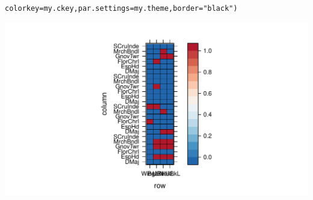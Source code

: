\documentclass[12pt]{article}\usepackage[]{graphicx}\usepackage[]{color}
\makeatletter
\def\maxwidth{ %
  \ifdim\Gin@nat@width>\linewidth
    \linewidth
  \else
    \Gin@nat@width
  \fi
}
\newcommand{\hlstr}[1]{\textcolor[rgb]{0.192,0.494,0.8}{#1}}%
\newcommand{\hlstd}[1]{\textcolor[rgb]{0.345,0.345,0.345}{#1}}%
\newcommand{\hlkwc}[1]{\textcolor[rgb]{0.333,0.667,0.333}{#1}}%
\newenvironment{kframe}{%
 \def\at@end@of@kframe{}%
 \ifinner\ifhmode%
  \def\at@end@of@kframe{\end{minipage}}%
  \begin{minipage}{\columnwidth}%
 \fi\fi%
 \def\FrameCommand##1{\hskip\@totalleftmargin \hskip-\fboxsep
 \colorbox{shadecolor}{##1}\hskip-\fboxsep
     \hskip-\linewidth \hskip-\@totalleftmargin \hskip\columnwidth}%
 \MakeFramed {\advance\hsize-\width
   \@totalleftmargin\z@ \linewidth\hsize
   \@setminipage}}%
 {\par\unskip\endMakeFramed%
 \at@end@of@kframe}
\newenvironment{knitrout}{}{} %
\makeatother
\begin{document}
\begin{knitrout}
\begin{kframe}
\begin{alltt}
     \hlkwc{colorkey} \hlstd{= my.ckey,} \hlkwc{par.settings} \hlstd{= my.theme,}\hlkwc{border} \hlstd{=} \hlstr{"black"}\hlstd{)}
\end{alltt}
\end{kframe}
\includegraphics[width=\maxwidth]{figure/unnamed-chunk-652} 

\end{knitrout}
\end{document}
